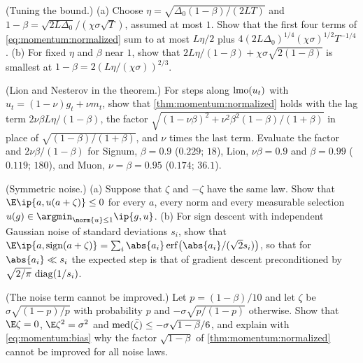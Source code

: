 \begin{refsection}
\begin{exercises}
\item \consolidation (Tuning the bound.) (a) Choose $\eta=\sqrt{\Delta_0(1-\beta)/(2LT)}$ and $1-\beta=\sqrt{2L\Delta_0}\big/(\chi\sigma\sqrt T)$, assumed at most $1$. Show that the first four terms of \eqref{eq:momentum:normalized} sum to at most $L\eta/2$ plus $4(2L\Delta_0)^{1/4}(\chi\sigma)^{1/2}T^{-1/4}$. (b) For fixed $\eta$ and $\beta$ near $1$, show that $2L\eta/(1-\beta)+\chi\sigma\sqrt{2(1-\beta)}$ is smallest at $1-\beta=2(L\eta/(\chi\sigma))^{2/3}$.\label{ex:momentum:tuning}

\item \variation (Lion and Nesterov in the theorem.) For steps along $\operatorname{lmo}(u_t)$ with $u_t=(1-\nu)g_t+\nu m_t$, show that \cref{thm:momentum:normalized} holds with the lag term $2\nu\beta L\eta/(1-\beta)$, the factor $\sqrt{(1-\nu\beta)^2+\nu^2\beta^2(1-\beta)/(1+\beta)}$ in place of $\sqrt{(1-\beta)/(1+\beta)}$, and $\nu$ times the last term. Evaluate the factor and $2\nu\beta/(1-\beta)$ for Signum, $\beta=0.9$ ($0.229$; $18$), Lion, $\nu\beta=0.9$ and $\beta=0.99$ ($0.119$; $180$), and Muon, $\nu=\beta=0.95$ ($0.174$; $36.1$).\label{ex:momentum:lion}

\item \variation (Symmetric noise.) (a) Suppose that $\zeta$ and $-\zeta$ have the same law. Show that $\E\ip{a,u(a+\zeta)}\le0$ for every $a$, every norm and every measurable selection $u(g)\in\argmin_{\norm{u}\le1}\ip{g,u}$.  (b) For sign descent with independent Gaussian noise of standard deviations $s_i$, show that $\E\ip{a,\sign(a+\zeta)}=\sum_i\abs{a_i}\erf\bigl(\abs{a_i}/(\sqrt2s_i)\bigr)$, so that for $\abs{a_i}\ll s_i$ the expected step is that of gradient descent preconditioned by $\sqrt{2/\pi}\,\operatorname{diag}(1/s_i)$.\label{ex:momentum:symmetric}

\item \variation\hard (The noise term cannot be improved.) Let $p=(1-\beta)/10$ and let $\zeta$ be $\sigma\sqrt{(1-p)/p}$ with probability $p$ and $-\sigma\sqrt{p/(1-p)}$ otherwise. Show that $\E\zeta=0$, $\E\zeta^2=\sigma^2$ and $\operatorname{med}(\bar\zeta)\le-\sigma\sqrt{1-\beta}/6$, and explain with \eqref{eq:momentum:bias} why the factor $\sqrt{1-\beta}$ of \cref{thm:momentum:normalized} cannot be improved for all noise laws. \label{ex:momentum:worst}


\end{exercises}
\end{refsection}
